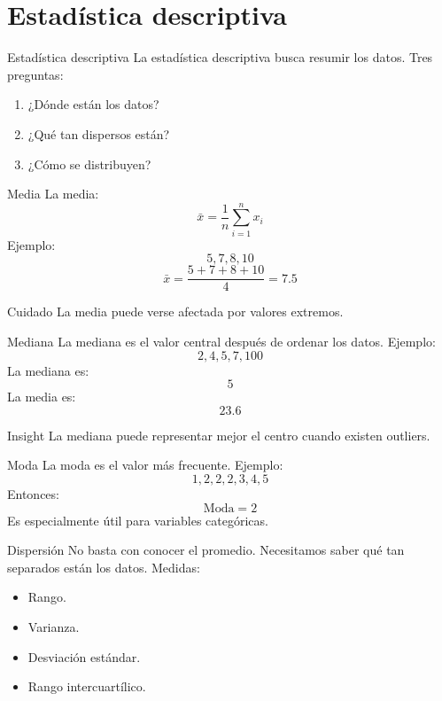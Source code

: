 \documentclass[aspectratio=169,11pt]{beamer}
\begin{document}
\section{Estadística descriptiva}
\begin{frame}{Estadística descriptiva}
La estadística descriptiva busca resumir los datos.
Tres preguntas:
\begin{enumerate}
    \item ¿Dónde están los datos?
    \item ¿Qué tan dispersos están?
    \item ¿Cómo se distribuyen?
\end{enumerate}
\end{frame}
\begin{frame}{Media}
La media:
\[
\bar{x} =
\frac{1}{n}
\sum_{i=1}^{n}x_i
\]
Ejemplo:
\[
5,7,8,10
\]
\[
\bar{x}
=
\frac{5+7+8+10}{4}
=
7.5
\]
\begin{alertblock}{Cuidado}
La media puede verse afectada por valores extremos.
\end{alertblock}
\end{frame}
\begin{frame}{Mediana}
La mediana es el valor central después de ordenar los datos.
Ejemplo:
\[
2,4,5,7,100
\]
La mediana es:
\[
5
\]
La media es:
\[
23.6
\]
\begin{block}{Insight}
La mediana puede representar mejor el centro cuando existen outliers.
\end{block}
\end{frame}
\begin{frame}{Moda}
La moda es el valor más frecuente.
Ejemplo:
\[
1,2,2,2,3,4,5
\]
Entonces:
\[
\text{Moda}=2
\]
Es especialmente útil para variables categóricas.
\end{frame}
\begin{frame}{Dispersión}
No basta con conocer el promedio.
Necesitamos saber qué tan separados están los datos.
Medidas:
\begin{itemize}
    \item Rango.
    \item Varianza.
    \item Desviación estándar.
    \item Rango intercuartílico.
\end{itemize}
\end{frame}
\end{document}

